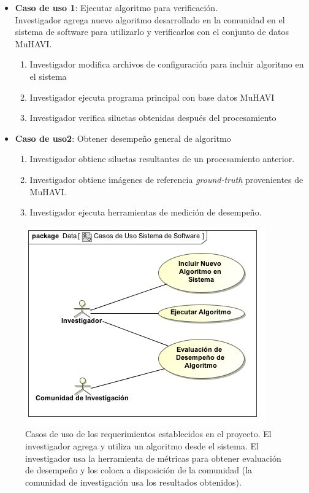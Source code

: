 \begin{itemize}
\item \textbf{Caso de uso 1}: Ejecutar algoritmo para verificación.\\
Investigador agrega nuevo algoritmo desarrollado en la comunidad en el sistema de software para utilizarlo y verificarlos con el conjunto de datos MuHAVI.
\begin{enumerate}
\item Investigador modifica archivos de configuración para incluir algoritmo en el sistema
\item Investigador ejecuta programa principal con base datos MuHAVI 
\item Investigador verifica siluetas obtenidas después del procesamiento
\end{enumerate}

\item \textbf{Caso de uso2}: Obtener desempeño general de algoritmo
\begin{enumerate}
\item Investigador obtiene siluetas resultantes de un procesamiento anterior.
\item Investigador obtiene imágenes de referencia \textit{ground-truth} provenientes de MuHAVI.
\item Investigador ejecuta herramientas de medición de desempeño.
\end{enumerate}
\end{itemize}



\begin{figure}[h!]
\centering
\includegraphics[scale=1.0]{img/ch5/use_case}
\caption[Casos de uso de los requerimientos establecidos en el proyecto]{Casos de uso de los requerimientos establecidos en el proyecto. El investigador agrega y utiliza un algoritmo desde el sistema. El investigador usa la herramienta de métricas para obtener evaluación de desempeño y los coloca a disposición de la comunidad (la comunidad de investigación usa los resultados obtenidos).}
\label{fig:ch5:use_case}
\end{figure}



